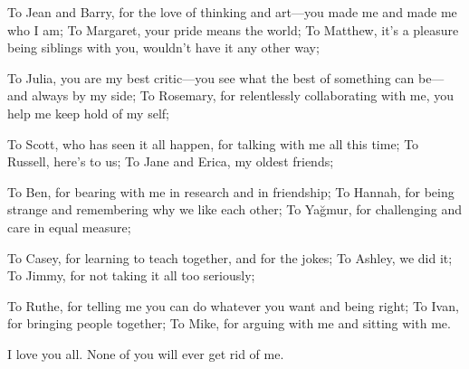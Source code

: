 \documentclass{ucetd}
\begin{document}
To Jean and Barry, for the love of thinking and art—you made me and made me who I am; To Margaret, your pride means the world; To Matthew, it's a pleasure being siblings with you, wouldn't have it any other way; 

To Julia, you are my best critic—you see what the best of something can be—and always by my side; To Rosemary, for relentlessly collaborating with me, you help me keep hold of my self;

To Scott, who has seen it all happen, for talking with me all this time; To Russell, here's to us; To Jane and Erica, my oldest friends;

To Ben, for bearing with me in research and in friendship; To Hannah, for being strange and remembering why we like each other; To Ya\u{g}mur, for challenging and care in equal measure; 

To Casey, for learning to teach together, and for the jokes; To Ashley, we did it; To Jimmy, for not taking it all too seriously;

To Ruthe, for telling me you can do whatever you want and being right; To Ivan, for bringing people together; To Mike, for arguing with me and sitting with me.

I love you all. None of you will ever get rid of me.
\end{document}
